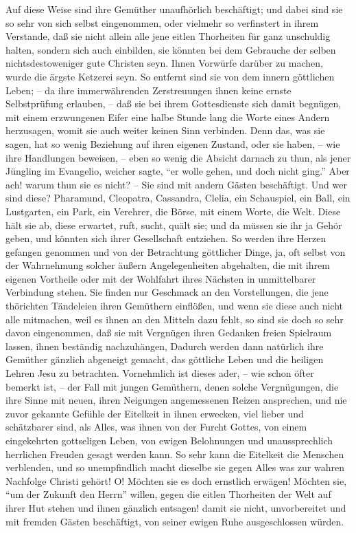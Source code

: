 Auf diese Weise sind ihre Gemüther unaufhörlich beschäftigt; und dabei sind sie
so sehr von sich selbst eingenommen, oder vielmehr so verfinstert in ihrem
Verstande, daß sie nicht allein alle jene eitlen Thorheiten für ganz unschuldig
halten, sondern sich auch einbilden, sie könnten bei dem Gebrauche der selben
nichtsdestoweniger gute Christen seyn. Ihnen Vorwürfe darüber zu machen, wurde
die ärgste Ketzerei seyn. So entfernt sind sie von dem innern göttlichen Leben;
-- da ihre immerwährenden Zerstreuungen ihnen keine ernste Selbstprüfung
erlauben, -- daß sie bei ihrem Gottesdienste sich damit begnügen, mit einem
erzwungenen Eifer eine halbe Stunde lang die Worte eines Andern herzusagen,
womit sie auch weiter keinen Sinn verbinden. Denn das, was sie sagen, hat so
wenig Beziehung auf ihren eigenen Zustand, oder sie haben, -- wie ihre
Handlungen beweisen, -- eben so wenig die Absicht darnach zu thun, als jener
Jüngling im Evangelio, weicher sagte, "`er wolle gehen, und doch nicht ging."'
Aber ach! warum thun sie es nicht? -- Sie sind mit andern Gästen beschäftigt.
Und wer sind diese? Pharamund, Cleopatra, Cassandra, Clelia, ein Schauspiel, ein
Ball, ein Lustgarten, ein Park, ein Verehrer, die Börse, mit einem Worte, die
Welt. Diese hält sie ab, diese erwartet, ruft, sucht, quält sie; und da müssen
sie ihr ja Gehör geben, und könnten sich ihrer Gesellschaft entziehen. So werden
ihre Herzen gefangen genommen und von der Betrachtung göttlicher Dinge, ja, oft
selbst von der Wahrnehmung solcher äußern Angelegenheiten abgehalten, die mit
ihrem eigenen Vortheile oder mit der Wohlfahrt ihres Nächsten in unmittelbarer
Verbindung stehen. Sie finden nur Geschmack an den Vorstellungen, die jene
thörichten Tändeleien ihren Gemüthern einflößen, und wenn sie diese auch nicht
alle mitmachen, weil es ihnen an den Mitteln dazu fehlt, so sind sie doch so
sehr davon eingenommen, daß sie mit Vergnügen ihren Gedanken freien Spielraum
lassen, ihnen beständig nachzuhängen, Dadurch werden dann natürlich ihre
Gemüther gänzlich abgeneigt gemacht, das göttliche Leben und die heiligen Lehren
Jesu zu betrachten. Vornehmlich ist dieses ader, -- wie schon öfter bemerkt ist,
-- der Fall mit jungen Gemüthern, denen solche Vergnügungen, die ihre Sinne mit
neuen, ihren Neigungen angemessenen Reizen ansprechen, und nie zuvor gekannte
Gefühle der Eitelkeit in ihnen erwecken, viel lieber und schätzbarer sind, als
Alles, was ihnen von der Furcht Gottes, von einem eingekehrten gottseligen
Leben, von ewigen Belohnungen und unaussprechlich herrlichen Freuden gesagt
werden kann. So sehr kann die Eitelkeit die Menschen verblenden, und so
unempfindlich macht dieselbe sie gegen Alles was zur wahren Nachfolge Christi
gehört! O! Möchten sie es doch ernstlich erwägen! Möchten sie, "`um der Zukunft
den Herrn"' willen, gegen die eitlen Thorheiten der Welt auf ihrer Hut stehen
und ihnen gänzlich entsagen! damit sie nicht, unvorbereitet und mit fremden
Gästen beschäftigt, von seiner ewigen Ruhe ausgeschlossen würden.

